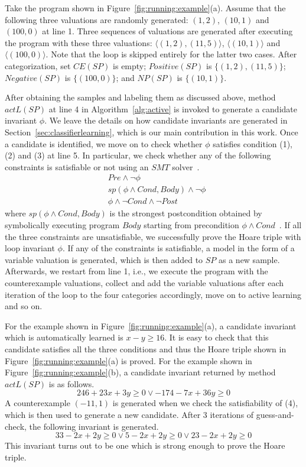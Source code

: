 \begin{example} \label{example2}
Take the program shown in Figure~\ref{fig:running:example}(a). Assume that the following three valuations are randomly generated:
$(1, 2)$, $(10, 1)$ and $(100, 0)$ at line 1. Three sequences of valuations are generated after executing the program with these three valuations: $\langle (1, 2), (11, 5) \rangle$, $\langle (10, 1) \rangle$ and $\langle (100, 0) \rangle$.
Note that the loop is skipped entirely for the latter two cases. After categorization, set $CE(SP)$ is empty; $Positive(SP)$ is $\{(1, 2),(11, 5)\}$; $Negative(SP)$ is $\{(100, 0)\}$; and $NP(SP)$ is $\{(10, 1)\}$.
\end{example}
After obtaining the samples and labeling them as discussed above, method $actL(SP)$ at line 4 in Algorithm~\ref{alg:active} is invoked to generate a candidate invariant $\phi$. We leave the details on how candidate invariants are generated in Section~\ref{sec:classifierlearning}, which is our main contribution in this work. Once a candidate is identified, we move on to check whether $\phi$ satisfies condition (1), (2) and (3) at line 5. In particular, we check whether any of the following constraints is satisfiable or not using an $SMT$ solver~\cite{barrett2009satisfiability,de2008z3}.
\begin{align}
    & \mathit{Pre} \land \neg \phi \label{check:inv:pre} \\
     & sp(\phi \land Cond, Body) \land \neg \phi \label{check:inv:loop} \\
    & \phi \land \neg Cond \land \neg Post \label{check:inv:post}
\end{align}
where $sp(\phi \land Cond,Body)$ is the strongest postcondition obtained by symbolically executing program $Body$ starting from precondition $\phi \land Cond$~\cite{DBLP:journals/cacm/Dijkstra75}. If all the three constraints are unsatisfiable, we successfully prove the Hoare triple with loop invariant $\phi$. If any of the constraints is satisfiable, a model in the form of a variable valuation is generated, which is then added to $SP$ as a new sample. Afterwards, we restart from line 1, i.e., we execute the program with the counterexample valuations, collect and add the variable valuations after each iteration of the loop to the four categories accordingly, move on to active learning and so on.
\begin{example}
For the example shown in Figure~\ref{fig:running:example}(a), a candidate invariant which is automatically learned is $x - y \geq 16$. It is easy to check that this candidate satisfies all the three conditions and thus the Hoare triple shown in Figure~\ref{fig:running:example}(a) is proved. For the example shown in Figure~\ref{fig:running:example}(b), a candidate invariant returned by method $actL(SP)$ is as follows.
\[
246 + 23x + 3y \geq 0 \lor -174 - 7x + 36y \geq 0
\]
A counterexample $(-11, 1)$ is generated when we check the satisfiability of (4), which is then used to generate a new candidate. After 3 iterations of guess-and-check, the following invariant is generated.
\[
33 - 2x + 2y \geq 0 \lor 5 - 2x + 2y \geq 0 \lor 23 - 2x + 2y \geq 0
\]
This invariant turns out to be one which is strong enough to prove the Hoare triple.
\end{example}


